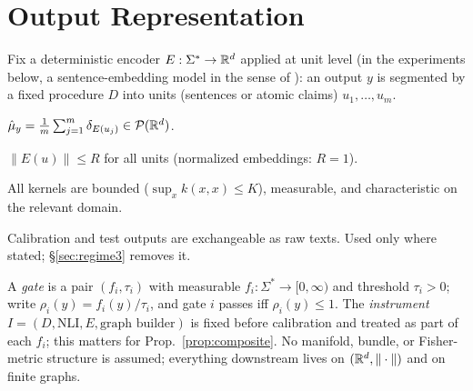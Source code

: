 \section{Output Representation}
\label{sec:representation}

Fix a deterministic encoder $E:\Sigma^*\to\mathbb{R}^d$ applied at unit level (in the
experiments below, a sentence-embedding model in the sense of
\cite{reimers2019}): an output $y$ is segmented by a fixed procedure $D$ into
units (sentences or atomic claims) $u_1,\dots,u_m$.

\begin{definition}
$\hat\mu_y=\frac1m\sum_{j=1}^m \delta_{E(u_j)}\in\mathcal{P}(\mathbb{R}^d)$.
\end{definition}

\begin{assumption}[A1]
$\|E(u)\|\le R$ for all units (normalized embeddings: $R=1$).
\end{assumption}

\begin{assumption}[A2]
All kernels are bounded ($\sup_x k(x,x)\le K$), measurable, and characteristic
on the relevant domain.
\end{assumption}

\begin{assumption}[A3]
Calibration and test outputs are exchangeable as raw texts. Used only where
stated; \S\ref{sec:regime3} removes it.
\end{assumption}

A \emph{gate} is a pair $(f_i,\tau_i)$ with measurable
$f_i:\Sigma^*\to[0,\infty)$ and threshold $\tau_i>0$; write
$\rho_i(y)=f_i(y)/\tau_i$, and gate $i$ passes iff $\rho_i(y)\le 1$. The
\emph{instrument} $I=(D,\mathrm{NLI},E,\text{graph builder})$ is fixed before
calibration and treated as part of each $f_i$; this matters for
Prop.~\ref{prop:composite}. No manifold, bundle, or Fisher-metric structure is
assumed; everything downstream lives on $(\mathbb{R}^d,\|\cdot\|)$ and on finite
graphs.

